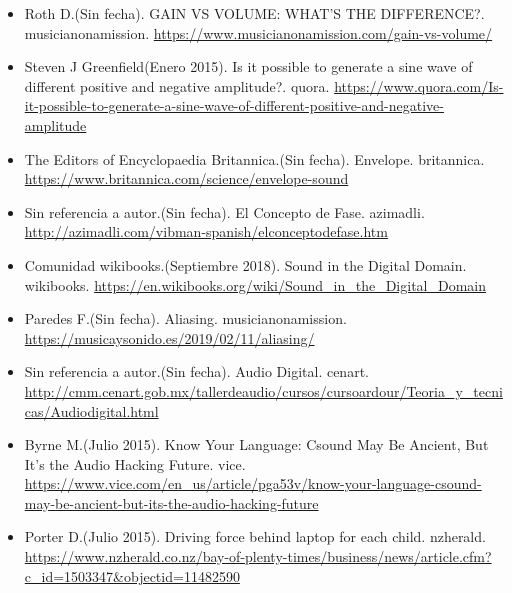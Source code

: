  \begin{itemize}
 \item Roth D.(Sin fecha). GAIN VS VOLUME: WHAT’S THE DIFFERENCE?. musicianonamission. \url{https://www.musicianonamission.com/gain-vs-volume/}
 
 \item Steven J Greenfield(Enero 2015). Is it possible to generate a sine wave of different positive and negative amplitude?. quora. \url{https://www.quora.com/Is-it-possible-to-generate-a-sine-wave-of-different-positive-and-negative-amplitude}
 
 \item The Editors of Encyclopaedia Britannica.(Sin fecha). Envelope. britannica. \url{https://www.britannica.com/science/envelope-sound}
  
 \item Sin referencia a autor.(Sin fecha). El Concepto de Fase. azimadli. \url{http://azimadli.com/vibman-spanish/elconceptodefase.htm}
 
 \item Comunidad wikibooks.(Septiembre 2018). Sound in the Digital Domain. wikibooks. \url{https://en.wikibooks.org/wiki/Sound_in_the_Digital_Domain}
  
 \item Paredes F.(Sin fecha). Aliasing. musicianonamission. \url{https://musicaysonido.es/2019/02/11/aliasing/}
   
 \item Sin referencia a autor.(Sin fecha). Audio Digital. cenart. \url{http://cmm.cenart.gob.mx/tallerdeaudio/cursos/cursoardour/Teoria_y_tecnicas/Audiodigital.html}
    
 \item Byrne M.(Julio 2015). Know Your Language: Csound May Be Ancient, But It's the Audio Hacking Future. vice. \url{https://www.vice.com/en_us/article/pga53v/know-your-language-csound-may-be-ancient-but-its-the-audio-hacking-future}
     
 \item Porter D.(Julio 2015). Driving force behind laptop for each child. nzherald. \url{https://www.nzherald.co.nz/bay-of-plenty-times/business/news/article.cfm?c_id=1503347&objectid=11482590}
 \end{itemize}
